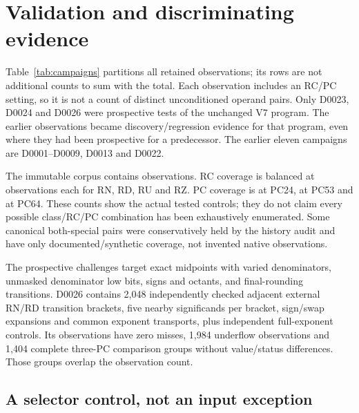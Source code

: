 \documentclass[11pt]{article}
\begin{document}
\section{Validation and discriminating evidence}
\label{sec:validation}

Table~\ref{tab:campaigns} partitions all retained observations; its rows are
not additional counts to sum with the total. Each observation includes an
RC/PC setting, so it is not a count of distinct unconditioned operand pairs.
Only D0023, D0024 and D0026 were prospective tests of the unchanged V7
program. The earlier observations became discovery/regression evidence for
that program, even where they had been prospective for a predecessor.
The earlier eleven campaigns are D0001--D0009, D0013 and D0022.

\begin{table}[htbp]
\centering

\caption{Retained evidence, partitioned by campaign. Every row has zero
final-V7 output, C1, exception and pre-load-flag misses.}
\label{tab:campaigns}
\end{table}

The immutable corpus contains \CorpusRows{} observations. RC coverage is
balanced at \RowsPerMode{} observations each for RN, RD, RU and RZ.
PC coverage is \PCtwentyfour{} at PC24, \PCfiftythree{} at PC53 and
\PCsixtyfour{} at PC64. These counts show the actual tested controls; they
do not claim every possible class/RC/PC combination has been exhaustively
enumerated. Some canonical both-special pairs were conservatively held by
the history audit and have only documented/synthetic coverage, not invented
native observations.

The prospective challenges target exact midpoints with varied denominators,
unmasked denominator low bits, signs and octants, and final-rounding
transitions. D0026 contains 2,048 independently checked adjacent external
RN/RD transition brackets, five nearby significands per bracket, sign/swap
expansions and common exponent transports, plus independent full-exponent
controls. Its \FinalChallengeRows{} observations have zero misses, 1,984
underflow observations and 1,404 complete three-PC comparison groups without
value/status differences. Those groups overlap the observation count.

\subsection{A selector control, not an input exception}
\end{document}
